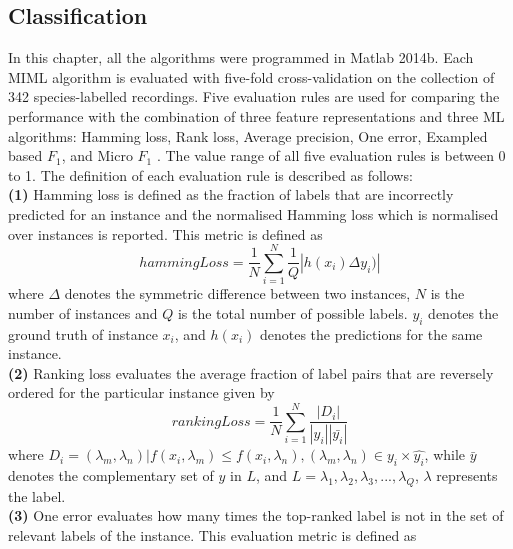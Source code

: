 \subsection{Classification}

\label{ch6:eveluationMetric}
In this chapter, all the algorithms were programmed in Matlab 2014b. Each MIML algorithm is evaluated with five-fold cross-validation on the collection of 342 species-labelled recordings. 
Five evaluation rules are used for comparing the performance with the combination of three feature representations and three ML algorithms: Hamming loss, Rank loss, Average precision, One error, Exampled based $F_{1}$, and Micro $F_{1}$ \citep{Madjarov20123084, zhou2008miml}. The value range of all five evaluation rules is between 0 to 1. The definition of each evaluation rule is described as follows:
\\
\textbf{(1)} Hamming loss is defined as the fraction of labels that are incorrectly predicted for an instance and the normalised Hamming loss which is normalised over instances is reported. This metric is defined as
\begin{equation}
hammingLoss = \frac{1}{N}\sum_{i=1}^{N}\frac{1}{Q}|h(x_{i})\Delta y_{i})|
\end{equation}
where $\Delta$ denotes the symmetric difference between two instances, $N$ is the number of instances and $Q$ is the total number of possible labels. $y_{i}$ denotes the ground truth of instance $x_{i}$, and $h(x_{i})$ denotes the predictions for the same instance. 
\\
\textbf{(2)} Ranking loss evaluates the average fraction of label pairs that are reversely ordered for the particular instance given by
\begin{equation}
rankingLoss = \frac{1}{N}\sum_{i=1}^{N}\frac{|D_{i}|}{|y_{i}||\bar{y_{i}}|}
\end{equation}
where $D_{i}={(\lambda_{m},\lambda_{n})| f(x_{i}, \lambda_{m}) \leq f(x_{i}, \lambda_{n}), (\lambda_{m}, \lambda_{n}) \in y_{i} \times \hat{y_{i}}}$,
while $\bar{y}$ denotes the complementary set of $y$ in $L$, and $L={\lambda_{1}, \lambda_{2}, \lambda_{3},..., \lambda_{Q}}$, $\lambda$ represents the label.
\\
\textbf{(3)} One error evaluates how many times the top-ranked label is
not in the set of relevant labels of the instance. This evaluation metric is defined as

